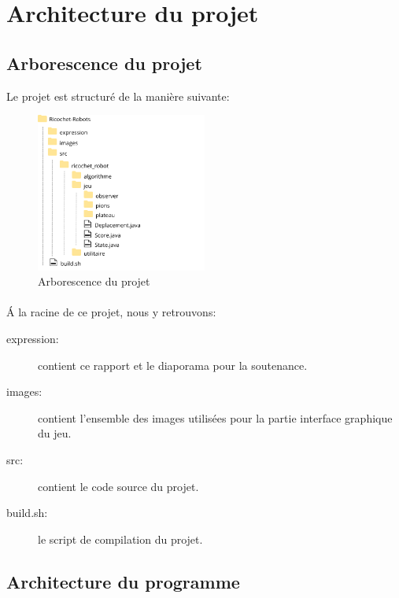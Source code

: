 \documentclass[a4paper, 12pt]{article}
\begin{document}
\newpage %

\section{Architecture du projet}
    \subsection{Arborescence du projet}
    
        Le projet est structuré de la manière suivante:
        
        \begin{figure}[H]
    		\centering\includegraphics[width=0.5\textwidth]{images/dossier.png}
    		\caption{Arborescence du projet}
    	\end{figure}
    	
    	\paragraph{}
    	Á la racine de ce projet, nous y retrouvons:
    	
    	\begin{description}
    	    \item [expression:] contient ce rapport et le diaporama pour la soutenance.
    	    \item [images:] contient l'ensemble des images utilisées pour la partie interface graphique du jeu.
    	    \item [src:] contient le code source du projet.
    	    \item [build.sh:] le script de compilation du projet.
    	\end{description}
    	
    \subsection{Architecture du programme}
    
\end{document}
